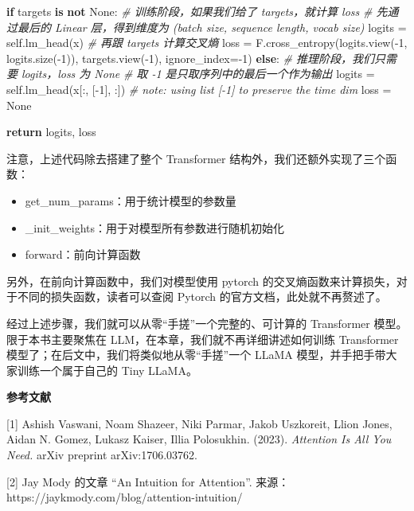 \documentclass[
]{article}
\newenvironment{Shaded}{}{}
\newcommand{\CommentTok}[1]{\textcolor[rgb]{0.38,0.63,0.69}{\textit{#1}}}
\newcommand{\ControlFlowTok}[1]{\textcolor[rgb]{0.00,0.44,0.13}{\textbf{#1}}}
\newcommand{\DecValTok}[1]{\textcolor[rgb]{0.25,0.63,0.44}{#1}}
\newcommand{\KeywordTok}[1]{\textcolor[rgb]{0.00,0.44,0.13}{\textbf{#1}}}
\newcommand{\NormalTok}[1]{#1}
\newcommand{\OperatorTok}[1]{\textcolor[rgb]{0.40,0.40,0.40}{#1}}
\newcommand{\VariableTok}[1]{\textcolor[rgb]{0.10,0.09,0.49}{#1}}
\providecommand{\tightlist}{%
  \setlength{\itemsep}{0pt}\setlength{\parskip}{0pt}}
\begin{document}
\begin{Shaded}
\begin{Highlighting}[]
        \ControlFlowTok{if}\NormalTok{ targets }\KeywordTok{is} \KeywordTok{not} \VariableTok{None}\NormalTok{:}
            \CommentTok{\# 训练阶段，如果我们给了 targets，就计算 loss}
            \CommentTok{\# 先通过最后的 Linear 层，得到维度为 (batch size, sequence length, vocab size)}
\NormalTok{            logits }\OperatorTok{=} \VariableTok{self}\NormalTok{.lm\_head(x)}
            \CommentTok{\# 再跟 targets 计算交叉熵}
\NormalTok{            loss }\OperatorTok{=}\NormalTok{ F.cross\_entropy(logits.view(}\OperatorTok{{-}}\DecValTok{1}\NormalTok{, logits.size(}\OperatorTok{{-}}\DecValTok{1}\NormalTok{)), targets.view(}\OperatorTok{{-}}\DecValTok{1}\NormalTok{), ignore\_index}\OperatorTok{={-}}\DecValTok{1}\NormalTok{)}
        \ControlFlowTok{else}\NormalTok{:}
            \CommentTok{\# 推理阶段，我们只需要 logits，loss 为 None}
            \CommentTok{\# 取 {-}1 是只取序列中的最后一个作为输出}
\NormalTok{            logits }\OperatorTok{=} \VariableTok{self}\NormalTok{.lm\_head(x[:, [}\OperatorTok{{-}}\DecValTok{1}\NormalTok{], :]) }\CommentTok{\# note: using list [{-}1] to preserve the time dim}
\NormalTok{            loss }\OperatorTok{=} \VariableTok{None}

        \ControlFlowTok{return}\NormalTok{ logits, loss}
\end{Highlighting}
\end{Shaded}

注意，上述代码除去搭建了整个 Transformer
结构外，我们还额外实现了三个函数：

\begin{itemize}
\tightlist
\item
  get\_num\_params：用于统计模型的参数量
\item
  \_init\_weights：用于对模型所有参数进行随机初始化
\item
  forward：前向计算函数
\end{itemize}

另外，在前向计算函数中，我们对模型使用 pytorch
的交叉熵函数来计算损失，对于不同的损失函数，读者可以查阅 Pytorch
的官方文档，此处就不再赘述了。

经过上述步骤，我们就可以从零``手搓''一个完整的、可计算的 Transformer
模型。限于本书主要聚焦在 LLM，在本章，我们就不再详细讲述如何训练
Transformer 模型了；在后文中，我们将类似地从零``手搓''一个 LLaMA
模型，并手把手带大家训练一个属于自己的 Tiny LLaMA。

\textbf{参考文献}

{[}1{]} Ashish Vaswani, Noam Shazeer, Niki Parmar, Jakob Uszkoreit,
Llion Jones, Aidan N. Gomez, Lukasz Kaiser, Illia Polosukhin. (2023).
\emph{Attention Is All You Need.} arXiv preprint arXiv:1706.03762.

{[}2{]} Jay Mody 的文章 ``An Intuition for Attention''.
来源：https://jaykmody.com/blog/attention-intuition/
\end{document}
